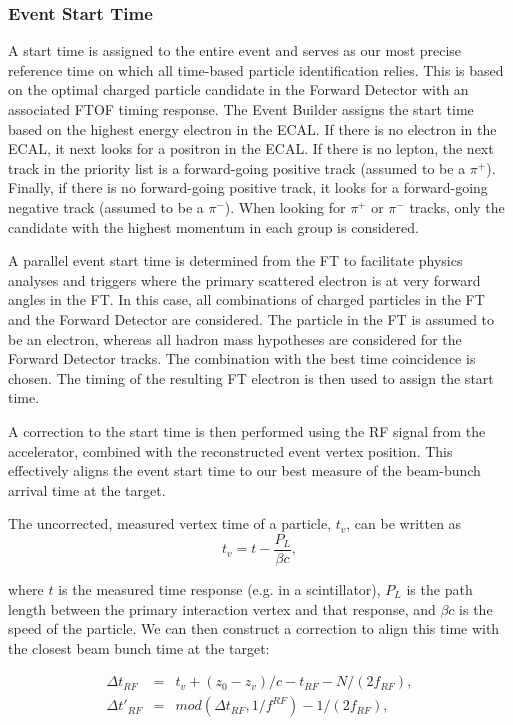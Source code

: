\subsubsection{Event Start Time}

A start time is assigned to the entire event and serves as our most precise reference time on which all time-based
particle identification relies. This is based on the optimal charged particle candidate in the Forward Detector with
an associated FTOF timing response. The Event Builder assigns the start time based on the highest energy electron
in the ECAL. If there is no electron in the ECAL, it next looks for a positron in the ECAL. If there is no lepton, the
next track in the priority list is a forward-going positive track (assumed to be a $\pi^+$). Finally, if there is no
forward-going positive track, it looks for a forward-going negative track (assumed to be a $\pi^-$). When looking
for $\pi^+$ or $\pi^-$ tracks, only the candidate with the highest momentum in each group is considered.

A parallel event start time is determined from the FT to facilitate physics analyses and triggers where the
primary scattered electron is at very forward angles in the FT. In this case, all combinations of charged particles
in the FT and the Forward Detector are considered. The particle in the FT is assumed to be an electron, whereas
all hadron mass hypotheses are considered for the Forward Detector tracks. The combination with the best time
coincidence is chosen. The timing of the resulting FT electron is then used to assign the start time.

A correction to the start time is then performed using the RF signal from the accelerator, combined with the
reconstructed event vertex position. This effectively aligns the event start time to our best measure of the
beam-bunch arrival time at the target.

The uncorrected, measured vertex time of a particle, $t_v$, can be written as
\begin{equation}
    t_v = t-\frac{P_L}{\beta c},
\end{equation}

\noindent
where $t$ is the measured time response (e.g. in a scintillator), $P_L$ is the path length between the primary
interaction vertex and that response, and $\beta c$ is the speed of the particle.  We can then construct a
correction to align this time with the closest beam bunch time at the target:

\begin{eqnarray}
\Delta t_{RF}\!\!\!\!&=&\!\!\!\! t_v + (z_0-z_v)/c - t_{RF} - N/(2 f_{RF}),\\
\Delta t'_{RF}\!\!\!\!&=&\!\!\!\! mod(\Delta t_{RF},1/f^{RF})-1/(2 f_{RF}),  \nonumber
\end{eqnarray}

